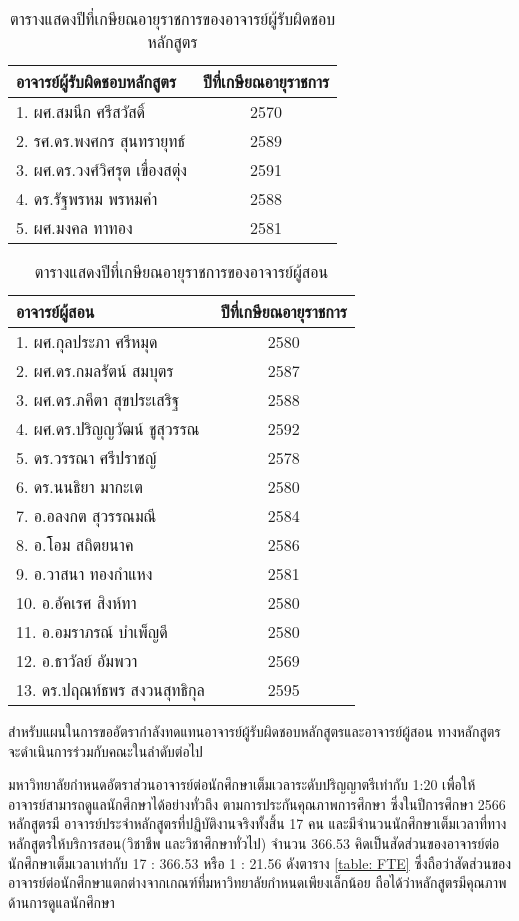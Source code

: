 \begin{longtable}{|l|c|}
	\caption{ตารางแสดงปีที่เกษียณอายุราชการของอาจารย์ผู้รับผิดชอบหลักสูตร}
	\\
	\hline
	\textbf{อาจารย์ผู้รับผิดชอบหลักสูตร} & \textbf{ปีที่เกษียณอายุราชการ}\\
	\hline
	1. ผศ.สมนึก ศรีสวัสดิ์ & 2570\\
	2. รศ.ดร.พงศกร สุนทรายุทธ์  &2589 \\ 
	3. ผศ.ดร.วงศ์วิศรุต เขื่องสตุ่ง & 2591\\
	4. ดร.รัฐพรหม พรหมคำ  &2588 \\
	5. ผศ.มงคล ทาทอง & 2581\\
	\hline
\end{longtable}
\newpage
\begin{longtable}{|l|c|}
	\caption{ตารางแสดงปีที่เกษียณอายุราชการของอาจารย์ผู้สอน}
	\\
	\hline
	\textbf{อาจารย์ผู้สอน} & \textbf{ปีที่เกษียณอายุราชการ}\\
	\hline
	1. ผศ.กุลประภา ศรีหมุด 	& 2580 \\
	2. ผศ.ดร.กมลรัตน์ สมบุตร 	&2587\\
	3. ผศ.ดร.ภคีตา สุขประเสริฐ	& 2588\\
	4. ผศ.ดร.ปริญญวัฒน์ ชูสุวรรณ &2592 \\
	5. ดร.วรรณา ศรีปราชญ์	& 2578\\
	6. ดร.นนธิยา มากะเต	& 2580\\
	7. อ.อลงกต สุวรรณมณี	& 2584\\
	8. อ.โอม สถิตยนาค	& 2586\\
	9. อ.วาสนา ทองกำแหง	& 2581\\
	10. อ.อัคเรศ สิงห์ทา	& 2580\\
	11. อ.อมราภรณ์ บำเพ็ญดี	& 2580\\
	12. อ.ธาวัลย์ อัมพวา	& 2569\\
	13. ดร.ปฤณท์ธพร สงวนสุทธิกุล	& 2595\\
	\hline
\end{longtable}

 สำหรับแผนในการขออัตรากำลังทดแทนอาจารย์ผู้รับผิดชอบหลักสูตรและอาจารย์ผู้สอน ทางหลักสูตรจะดำเนินการร่วมกับคณะในลำดับต่อไป


\begin{doclist}
\end{doclist}
มหาวิทยาลัยกำหนดอัตราส่วนอาจารย์ต่อนักศึกษาเต็มเวลาระดับปริญญาตรีเท่ากับ 1:20 เพื่อให้
อาจารย์สามารถดูแลนักศึกษาได้อย่างทั่วถึง ตามการประกันคุณภาพการศึกษา ซึ่งในปีการศึกษา 2566 หลักสูตรมี
อาจารย์ประจำหลักสูตรที่ปฏิบัติงานจริงทั้งสิ้น 17 คน และมีจำนวนนักศึกษาเต็มเวลาที่ทางหลักสูตรให้บริการสอน(วิชาชีพ และวิชาศึกษาทั่วไป) จำนวน 366.53 คิดเป็นสัดส่วนของอาจารย์ต่อนักศึกษาเต็มเวลาเท่ากับ 17 : 366.53 หรือ 1 : 21.56 ดังตาราง \ref{table: FTE} ซึ่งถือว่าสัดส่วนของอาจารย์ต่อนักศึกษาแตกต่างจากเกณฑ์ที่มหาวิทยาลัยกำหนดเพียงเล็กน้อย ถือได้ว่าหลักสูตรมีคุณภาพด้านการดูแลนักศึกษา

